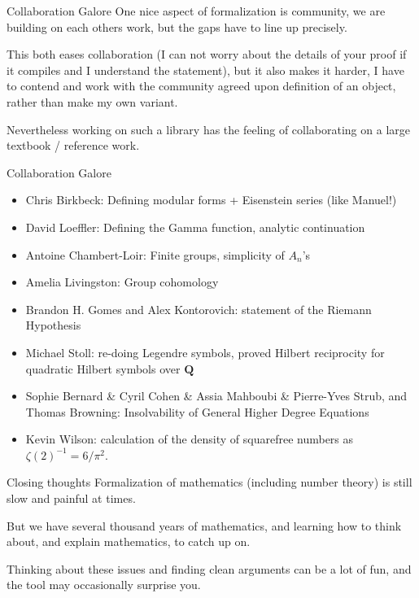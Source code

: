 \documentclass{beamer}
\theoremstyle{plain}
\newcommand{\QQ}{\mathbf Q}
\newcommand{\inv}{^{-1}}
\begin{document}
\begin{frame}{Collaboration Galore}
    One nice aspect of formalization is community, we are building on each others work, but the gaps have to line up precisely.

    This both eases collaboration (I can not worry about the details of your proof if it compiles and I understand the statement), but it also makes it harder, I have to contend and work with the community agreed upon definition of an object, rather than make my own variant.

    Nevertheless working on such a library has the feeling of collaborating on a large textbook / reference work.
\end{frame}

\begin{frame}{Collaboration Galore}
    \begin{itemize}
        \item Chris Birkbeck: Defining modular forms + Eisenstein series (like Manuel!)
        \item David Loeffler: Defining the Gamma function, analytic continuation
        \item Antoine Chambert-Loir: Finite groups, simplicity of $A_n$'s
        \item Amelia Livingston: Group cohomology
        \item Brandon H. Gomes and Alex Kontorovich: statement of the Riemann Hypothesis
        \item Michael Stoll: re-doing Legendre symbols, proved Hilbert reciprocity for quadratic Hilbert symbols over $\QQ$
        \item Sophie Bernard \& Cyril Cohen \& Assia Mahboubi \& Pierre-Yves Strub, and Thomas Browning: Insolvability of General Higher Degree Equations
        \item Kevin Wilson: calculation of the density of squarefree numbers as $\zeta (2)\inv = 6 / \pi ^2 $.
    \end{itemize}
\end{frame}

\begin{frame}{Closing thoughts}
    Formalization of mathematics (including number theory) is still slow and painful at times.

    But we have several thousand years of mathematics, and learning how to think about, and explain mathematics, to catch up on.

    Thinking about these issues and finding clean arguments can be a lot of fun, and the tool may occasionally surprise you.
\end{frame}
\end{document}
